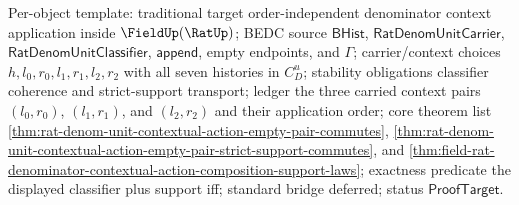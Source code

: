 Per-object template: traditional target order-independent denominator context
application inside $\FieldUp(\RatUp)$; BEDC source $\mathsf{BHist}$,
$\mathsf{RatDenomUnitCarrier}$, $\mathsf{RatDenomUnitClassifier}$,
$\mathsf{append}$, empty endpoints, and $\Gamma$; carrier/context choices
$h,l_0,r_0,l_1,r_1,l_2,r_2$ with all seven histories in $C_D^u$; stability
obligations classifier coherence and strict-support transport; ledger the three
carried context pairs $(l_0,r_0)$, $(l_1,r_1)$, and $(l_2,r_2)$ and their
application order; core theorem list
\autoref{thm:rat-denom-unit-contextual-action-empty-pair-commutes},
\autoref{thm:rat-denom-unit-contextual-action-empty-pair-strict-support-commutes},
and \autoref{thm:field-rat-denominator-contextual-action-composition-support-laws};
exactness predicate the displayed classifier plus support iff; standard bridge
deferred; status $\mathsf{ProofTarget}$.

